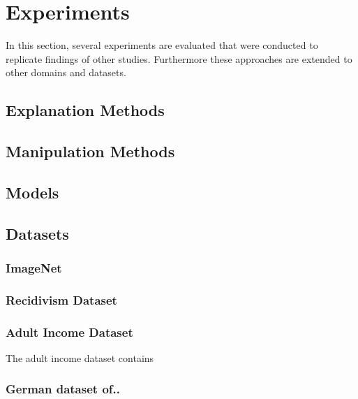 \section{Experiments}
\label{sec:experiments}
In this section, several experiments are evaluated that were conducted to replicate findings of other studies. Furthermore these approaches are extended to other domains and datasets. 


\subsection{Explanation Methods}

\subsection{Manipulation Methods}

\subsection{Models}

\subsection{Datasets}

\subsubsection{ImageNet}
\subsubsection{Recidivism Dataset}
\subsubsection{Adult Income Dataset}
The adult income dataset \cite{adult_income} contains 

\subsubsection{German dataset of..}